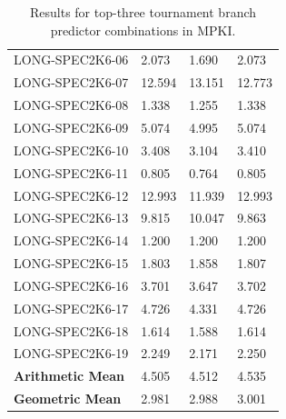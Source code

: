 \documentclass{article}
\begin{document}
\begin{table}[h]
\begin{tabular}{llll}
        LONG-SPEC2K6-06  & 2.073 & 1.690 & 2.073 \\
        LONG-SPEC2K6-07  & 12.594 & 13.151 & 12.773 \\
        LONG-SPEC2K6-08  & 1.338 & 1.255 & 1.338 \\
        LONG-SPEC2K6-09  & 5.074 & 4.995 & 5.074 \\
        LONG-SPEC2K6-10  & 3.408 & 3.104 & 3.410 \\
        LONG-SPEC2K6-11  & 0.805 & 0.764 & 0.805 \\
        LONG-SPEC2K6-12  & 12.993 & 11.939 & 12.993 \\
        LONG-SPEC2K6-13  & 9.815 & 10.047 & 9.863 \\
        LONG-SPEC2K6-14  & 1.200 & 1.200 & 1.200 \\
        LONG-SPEC2K6-15  & 1.803 & 1.858 & 1.807 \\
        LONG-SPEC2K6-16  & 3.701 & 3.647 & 3.702 \\
        LONG-SPEC2K6-17  & 4.726 & 4.331 & 4.726 \\
        LONG-SPEC2K6-18  & 1.614 & 1.588 & 1.614 \\
        LONG-SPEC2K6-19  & 2.249 & 2.171 & 2.250 \\
        \midrule
        \textbf{Arithmetic Mean}  & 4.505 & 4.512 & 4.535 \\
        \textbf{Geometric Mean}  & 2.981 & 2.988 & 3.001 \\
        \bottomrule
    \end{tabular}
    \caption{Results for top-three tournament branch predictor combinations in MPKI.}
    \label{tab:tbp_res}
\end{table}
\end{document}
